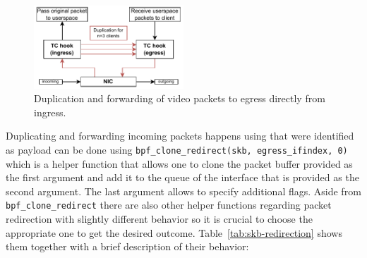 \begin{figure}[htbp]
    \centering
    \includegraphics[width=0.5\textwidth]{figures/03_fast_relays/packet-forwarding.drawio.pdf}
    \caption[Video packet duplication]{Duplication and forwarding of video packets to egress directly 
    from ingress.}\label{fig:packet-forwarding-duplication}
\end{figure}

Duplicating and forwarding incoming packets happens using that were identified as payload 
can be done using \verb|bpf_clone_redirect(skb, egress_ifindex, 0)| which is a helper function
that allows one to clone the packet buffer provided as the first argument and add it to the 
queue of the interface that is provided as the second argument.
The last argument allows to specify additional flags.
Aside from \verb|bpf_clone_redirect| there are also other helper functions regarding packet
redirection with slightly different behavior so it is crucial to choose the appropriate one
to get the desired outcome.
Table~\ref{tab:skb-redirection} shows them together with a brief description of their behavior:


